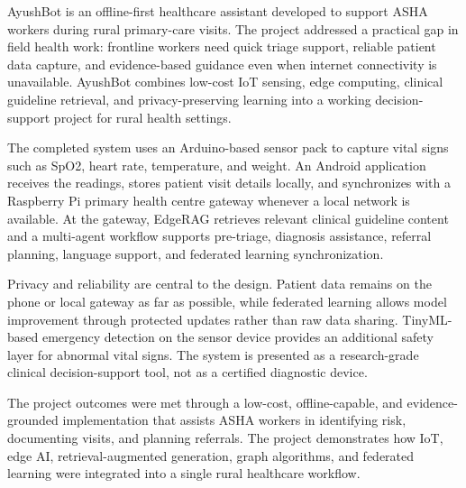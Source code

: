 \documentclass[12pt,a4paper,openany]{report}
\begin{document}
\begin{center}
\begin{minipage}{0.94\textwidth}
AyushBot is an offline-first healthcare assistant developed to support ASHA workers during rural primary-care visits. The project addressed a practical gap in field health work: frontline workers need quick triage support, reliable patient data capture, and evidence-based guidance even when internet connectivity is unavailable. AyushBot combines low-cost IoT sensing, edge computing, clinical guideline retrieval, and privacy-preserving learning into a working decision-support project for rural health settings.

The completed system uses an Arduino-based sensor pack to capture vital signs such as SpO2, heart rate, temperature, and weight. An Android application receives the readings, stores patient visit details locally, and synchronizes with a Raspberry Pi primary health centre gateway whenever a local network is available. At the gateway, EdgeRAG retrieves relevant clinical guideline content and a multi-agent workflow supports pre-triage, diagnosis assistance, referral planning, language support, and federated learning synchronization.

Privacy and reliability are central to the design. Patient data remains on the phone or local gateway as far as possible, while federated learning allows model improvement through protected updates rather than raw data sharing. TinyML-based emergency detection on the sensor device provides an additional safety layer for abnormal vital signs. The system is presented as a research-grade clinical decision-support tool, not as a certified diagnostic device.

The project outcomes were met through a low-cost, offline-capable, and evidence-grounded implementation that assists ASHA workers in identifying risk, documenting visits, and planning referrals. The project demonstrates how IoT, edge AI, retrieval-augmented generation, graph algorithms, and federated learning were integrated into a single rural healthcare workflow.
\end{minipage}
\end{center}
\clearpage
\end{document}
